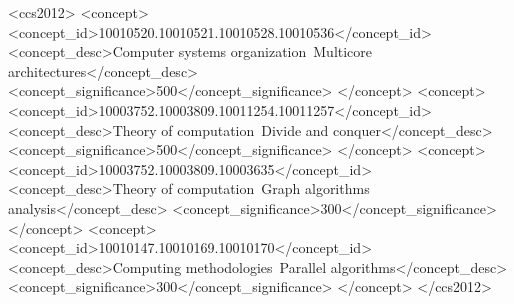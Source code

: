 \documentclass[sigconf]{acmart}
\begin{document}


\begin{CCSXML}
<ccs2012>
   <concept>
       <concept_id>10010520.10010521.10010528.10010536</concept_id>
       <concept_desc>Computer systems organization~Multicore architectures</concept_desc>
       <concept_significance>500</concept_significance>
       </concept>
   <concept>
       <concept_id>10003752.10003809.10011254.10011257</concept_id>
       <concept_desc>Theory of computation~Divide and conquer</concept_desc>
       <concept_significance>500</concept_significance>
       </concept>
   <concept>
       <concept_id>10003752.10003809.10003635</concept_id>
       <concept_desc>Theory of computation~Graph algorithms analysis</concept_desc>
       <concept_significance>300</concept_significance>
       </concept>
   <concept>
       <concept_id>10010147.10010169.10010170</concept_id>
       <concept_desc>Computing methodologies~Parallel algorithms</concept_desc>
       <concept_significance>300</concept_significance>
       </concept>
 </ccs2012>
\end{CCSXML}



\maketitle



















\end{document}
